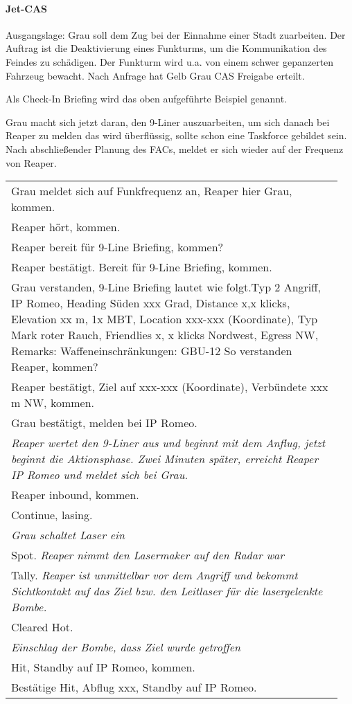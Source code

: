 \paragraph*{Jet-CAS}
	Ausgangslage: Grau soll dem Zug bei der Einnahme einer Stadt zuarbeiten. 
	Der Auftrag ist die Deaktivierung eines Funkturms, um die Kommunikation des Feindes zu schädigen. Der Funkturm wird u.a. von einem schwer gepanzerten Fahrzeug bewacht. 
	Nach Anfrage hat Gelb Grau CAS Freigabe erteilt.
	\par\medskip
	Als Check-In Briefing wird das oben aufgeführte Beispiel genannt.\par
	Grau macht sich jetzt daran, den 9-Liner auszuarbeiten, um sich danach bei Reaper zu
	melden das wird überflüssig, sollte schon eine Taskforce gebildet sein. Nach
	abschließender Planung des FACs, meldet er sich wieder auf der Frequenz von Reaper.
	\begin{longtable}{P{0.95\linewidth}}
	\toprule
	Grau meldet sich auf Funkfrequenz an, Reaper hier Grau, kommen.\\
	\rcg Reaper hört, kommen.\\
	Reaper bereit für 9-Line Briefing, kommen?\\
	\rcg Reaper bestätigt. Bereit für 9-Line Briefing, kommen.\\
	Grau verstanden, 9-Line Briefing lautet wie folgt.Typ 2 Angriff, IP Romeo, Heading Süden xxx Grad, Distance x,x klicks, Elevation xx m, 1x MBT, Location xxx-xxx (Koordinate), Typ Mark roter Rauch,  Friendlies x, x klicks Nordwest, Egress NW, Remarks: Waffeneinschränkungen: GBU-12 So verstanden Reaper, kommen?\\
	\rcg Reaper bestätigt, Ziel auf xxx-xxx (Koordinate), Verbündete xxx m NW, kommen.\\
	Grau bestätigt, melden bei IP Romeo.\\
	\rcg \textit{Reaper wertet den 9-Liner aus und beginnt mit dem Anflug, jetzt beginnt die Aktionsphase. Zwei Minuten später, erreicht Reaper IP Romeo und meldet sich bei Grau.}\\
	\rcg Reaper inbound, kommen.\\
	Continue, lasing.\\
	\textit{Grau schaltet Laser ein}\\
	\rcg Spot. \textit{Reaper nimmt den Lasermaker auf den Radar war}\\
	\rcg Tally. \textit{Reaper ist unmittelbar vor dem Angriff und bekommt Sichtkontakt auf das Ziel bzw. den Leitlaser für die lasergelenkte Bombe.}\\
	Cleared Hot.\\
	\rcg \textit{Einschlag der Bombe, dass Ziel wurde getroffen}\\
	Hit, Standby auf IP Romeo, kommen.\\
	\rcg Bestätige Hit, Abflug xxx, Standby auf IP Romeo.\\
	\bottomrule
	\end{longtable}